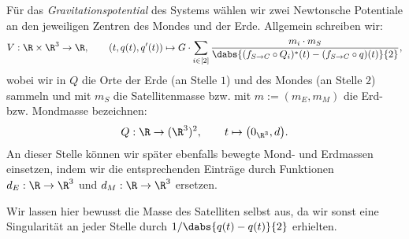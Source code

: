 \documentclass{subfiles}
\begin{document}
    Für das \emph{Gravitationspotential} des Systems wählen wir zwei Newtonsche Potentiale an den jeweiligen Zentren des Mondes und der Erde. Allgemein schreiben wir:
    \[
        V:\R\times\R^3\to \R,\qquad (t,q(t),q'(t))\mapsto G\cdot\sum_{i\in[2]}\frac{m_i\cdot m_S}{\dabs{(f_{S\to C}\circ Q_i)^*(t) - (f_{S\to C}\circ q)(t)}{2}},
    \]
    wobei wir in $Q$ die Orte der Erde (an Stelle $1$) und des Mondes (an Stelle $2$) sammeln und mit $m_S$ die Satellitenmasse bzw. mit $m:=(m_E,m_M)$ die Erd- bzw. Mondmasse bezeichnen:
    \[
        Q:\R\to(\R^3)^2,\qquad t\mapsto \bigl(0_{\R^3},d\bigr).
    \]
    An dieser Stelle können wir später ebenfalls bewegte Mond- und Erdmassen einsetzen, indem wir die entsprechenden Einträge durch Funktionen $d_E:\R\to\R^3$ und $d_M:\R\to\R^3$ ersetzen.

    Wir lassen hier bewusst die Masse des Satelliten selbst aus, da wir sonst eine Singularität an jeder Stelle durch $1/\dabs{q(t)-q(t)}{2}$ erhielten.\\
\end{document}

